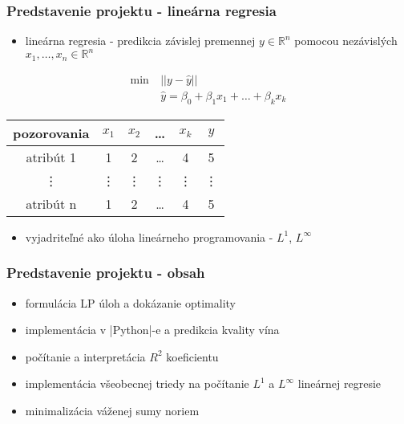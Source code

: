 \documentclass[presentation.tex]{subfiles}
\begin{document}
\begin{frame}

\frametitle{Predstavenie projektu - lineárna regresia}
\begin{itemize}
	\item lineárna regresia - predikcia závislej premennej $y \in \mathbb{R}^n$ pomocou nezávislých $x_1,\dots,x_n \in \mathbb{R}^n$
\end{itemize}
\begin{align*}
	\min~&||y - \hat{y}|| \\
	&\hat{y} = \beta_0 + \beta_1x_1 + \dots + \beta_kx_k
\end{align*}

\begin{center}
	\small
	\begin{tabular}{| c || c | c | c | c | c |}
		\hline
		pozorovania & $x_1$ & $x_2$ & \dots & $x_k$ & $y$ \\
		\hline
		atribút 1 & 1 & 2 & \dots & 4 & 5 \\
		\hline
		\vdots & \vdots & \vdots & \vdots & \vdots & \vdots \\
		\hline
		atribút n & 1 & 2 & \dots & 4 & 5 \\
		\hline
	\end{tabular}
\end{center}

\begin{itemize}
	\item vyjadriteľné ako úloha lineárneho programovania - $L^1$, $L^{\infty}$
\end{itemize}

\end{frame}

\begin{frame}
	\frametitle{Predstavenie projektu - obsah}

\begin{itemize}
	\item formulácia LP úloh a dokázanie optimality 
	\item implementácia v \pyth|Python|-e a predikcia kvality vína
	\item počítanie a interpretácia $R^2$ koeficientu
	\item implementácia všeobecnej triedy na počítanie $L^1$ a $L^{\infty}$ lineárnej regresie
	\item minimalizácia váženej sumy noriem
\end{itemize}

\end{frame}


	
\end{document}
